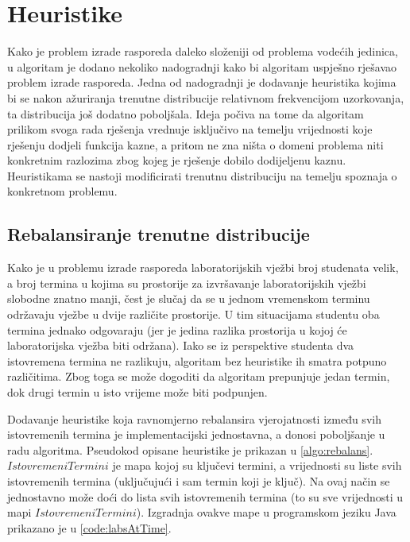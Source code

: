\documentclass[times, utf8, zavrsni]{fer}
\begin{document}
\section{Heuristike}
\label{sec:heuristike}
Kako je problem izrade rasporeda daleko složeniji od problema vodećih jedinica, u algoritam je dodano nekoliko nadogradnji
kako bi algoritam uspješno rješavao problem izrade rasporeda. Jedna od nadogradnji je dodavanje heuristika kojima bi
se nakon ažuriranja trenutne distribucije relativnom frekvencijom uzorkovanja, ta distribucija još dodatno poboljšala.
Ideja počiva na tome da algoritam prilikom svoga rada rješenja vrednuje isključivo na temelju vrijednosti koje rješenju
dodjeli funkcija kazne, a pritom ne zna ništa o domeni problema niti konkretnim razlozima zbog kojeg je rješenje dobilo
dodijeljenu kaznu. Heuristikama se nastoji modificirati trenutnu distribuciju na temelju spoznaja o konkretnom problemu.

\subsection{Rebalansiranje trenutne distribucije}
\label{sec:rebalans}
Kako je u problemu izrade rasporeda laboratorijskih vježbi broj studenata velik, a broj termina u kojima su prostorije
za izvršavanje laboratorijskih vježbi slobodne znatno manji, čest je slučaj da se u jednom vremenskom terminu održavaju vježbe u dvije
različite prostorije. U tim situacijama studentu oba termina jednako odgovaraju (jer je jedina razlika prostorija u kojoj
će laboratorijska vježba biti održana). Iako se iz perspektive studenta dva istovremena termina ne razlikuju, algoritam
bez heuristike ih smatra potpuno različitima. Zbog toga se može dogoditi da algoritam prepunjuje jedan termin, dok drugi termin
u isto vrijeme može biti podpunjen.

Dodavanje heuristike koja ravnomjerno rebalansira vjerojatnosti između svih istovremenih
termina je implementacijski jednostavna, a donosi poboljšanje u radu algoritma. Pseudokod opisane heuristike je prikazan u
\ref{algo:rebalans}. $IstovremeniTermini$ je mapa kojoj su ključevi termini, a vrijednosti su liste svih istovremenih termina
(uključujući i sam termin koji je ključ). Na ovaj način se jednostavno može doći do lista svih istovremenih termina (to su sve vrijednosti
u mapi $IstovremeniTermini$). Izgradnja ovakve mape u programskom jeziku Java prikazano je u \ref{code:labsAtTime}.
\end{document}
